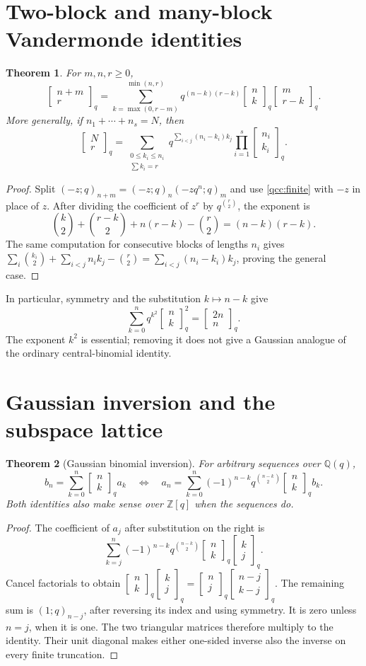 \documentclass[11pt,a4paper,oneside,openany]{book}
\newtheorem{theorem}{Theorem}[chapter]
\theoremstyle{definition}
\theoremstyle{remark}
\newcommand{\Z}{\mathbb Z}
\newcommand{\Q}{\mathbb Q}
\newcommand{\GB}[3][q]{\begin{bmatrix}#2\\#3\end{bmatrix}_{#1}}
\begin{document}
\section{Two-block and many-block Vandermonde identities}
\begin{theorem}\label{qcc:vandermonde}
For \(m,n,r\ge0\),
\begin{equation}\label{qcc:vandermonde-formula}
 \GB{n+m}r=
 \sum_{k=\max(0,r-m)}^{\min(n,r)}
 q^{(n-k)(r-k)}\GB nk\GB m{r-k}.
\end{equation}
More generally, if \(n_1+\cdots+n_s=N\), then
\begin{equation}\label{qcc:block-vandermonde}
 \GB Nr=\sum_{\substack{0\le k_i\le n_i\\\sum k_i=r}}
 q^{\sum_{i<j}(n_i-k_i)k_j}\prod_{i=1}^s\GB{n_i}{k_i}.
\end{equation}
\end{theorem}
\begin{proof}
Split \((-z;q)_{n+m}=(-z;q)_n(-zq^n;q)_m\) and use
\eqref{qcc:finite} with \(-z\) in place of \(z\).
After dividing the coefficient of \(z^r\) by \(q^{\binom r2}\), the exponent is
\[
 \binom k2+\binom{r-k}2+n(r-k)-\binom r2=(n-k)(r-k).
\]
The same computation for consecutive blocks of lengths \(n_i\) gives
\(\sum_i\binom{k_i}2+\sum_{i<j}n_i k_j-\binom r2
 =\sum_{i<j}(n_i-k_i)k_j\), proving the general case.
\end{proof}
In particular, symmetry and the substitution \(k\mapsto n-k\) give
\begin{equation}\label{qcc:central}
 \sum_{k=0}^n q^{k^2}\GB nk^2=\GB{2n}n.
\end{equation}
The exponent \(k^2\) is essential; removing it does not give a Gaussian analogue
of the ordinary central-binomial identity.

\section{Gaussian inversion and the subspace lattice}
\begin{theorem}[Gaussian binomial inversion]\label{qcc:inversion}
For arbitrary sequences over \(\Q(q)\),
\begin{equation}\label{qcc:inverse-pair}
 b_n=\sum_{k=0}^n\GB nk a_k
 \quad\Longleftrightarrow\quad
 a_n=\sum_{k=0}^n(-1)^{n-k}q^{\binom{n-k}{2}}\GB nk b_k.
\end{equation}
Both identities also make sense over \(\Z[q]\) when the sequences do.
\end{theorem}
\begin{proof}
The coefficient of \(a_j\) after substitution on the right is
\[
 \sum_{k=j}^n(-1)^{n-k}q^{\binom{n-k}{2}}\GB nk\GB kj.
\]
Cancel factorials to obtain
\(\GB nk\GB kj=\GB nj\GB{n-j}{k-j}\).
The remaining sum is \((1;q)_{n-j}\), after reversing its index and using
symmetry. It is zero unless \(n=j\), when it is one. The two triangular
matrices therefore multiply to the identity. Their unit diagonal makes either
one-sided inverse also the inverse on every finite truncation.
\end{proof}
\end{document}
